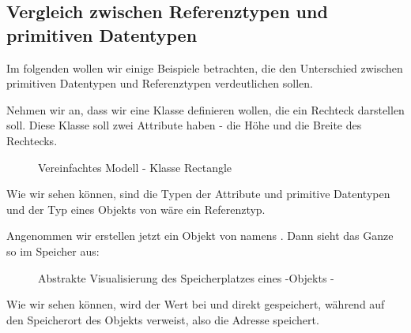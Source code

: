 \documentclass{tuda-pub}
\begin{document}
  \clearpage

  \subsection{Vergleich zwischen Referenztypen und primitiven Datentypen}
  \label{sec:Vergleich_Refernztypen_primitive_Datentypen}
  Im folgenden wollen wir einige Beispiele betrachten, die den Unterschied zwischen primitiven
  Datentypen und Referenztypen verdeutlichen sollen.

  \br

  Nehmen wir an, dass wir eine Klasse  definieren wollen, die ein Rechteck
  darstellen soll. Diese Klasse soll zwei Attribute haben - die Höhe und die Breite des Rechtecks.

  \begin{figure}[h]
    \centering
    
    \caption{Vereinfachtes Modell - Klasse Rectangle}
  \end{figure}

  Wie wir sehen können, sind die Typen der Attribute  und 
  primitive Datentypen und der Typ eines Objekts von  wäre ein Referenztyp.

  \br

  Angenommen wir erstellen jetzt ein Objekt von  namens .
  Dann sieht das Ganze so im Speicher aus:

  \begin{figure}[h]
    \centering
    \begin{memory}
    \end{memory}
    \caption{Abstrakte Visualisierung des Speicherplatzes eines -Objekts -
    }
    \label{fig:Rectangle}
  \end{figure}

  Wie wir sehen können, wird der Wert bei  und  direkt
  gespeichert, während  auf den Speicherort des Objekts verweist, also die Adresse
  speichert.

  \clearpage
\end{document}
